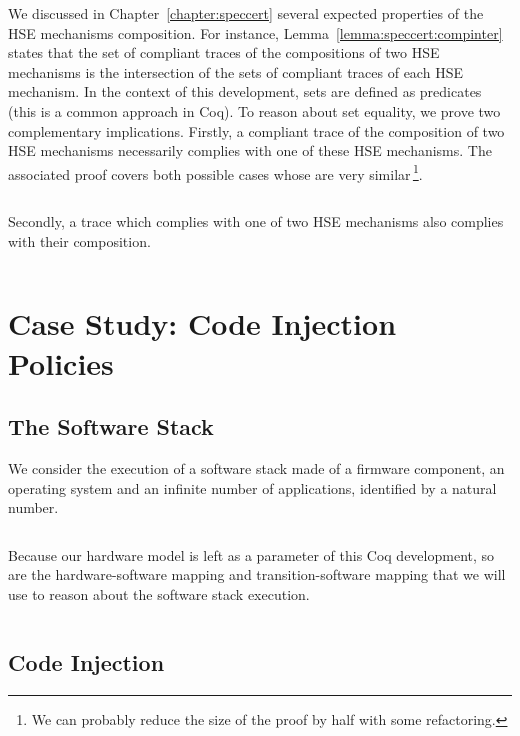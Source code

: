 \inputminted[gobble=2,firstline=424,lastline=428]{coq}{Listings/SpecCert.v}

We discussed in Chapter~\ref{chapter:speccert} several expected properties of
the HSE mechanisms composition.
%
For instance, Lemma~\ref{lemma:speccert:compinter} states that the set of
compliant traces of the compositions of two HSE mechanisms is the intersection
of the sets of compliant traces of each HSE mechanism.
%
In the context of this development, sets are defined as predicates (this is a
common approach in Coq).
%
To reason about set equality, we prove two complementary implications.
%
Firstly, a compliant trace of the composition of two HSE mechanisms necessarily
complies with one of these HSE mechanisms.
%
The associated proof covers both possible cases whose are very
similar\,\footnote{We can probably reduce the size of the proof by half with
  some refactoring.}.

\inputminted[gobble=2,firstline=472,lastline=512]{coq}{Listings/SpecCert.v}

Secondly, a trace which complies with one of two HSE mechanisms also complies
with their composition.

\inputminted[gobble=2,firstline=514,lastline=537]{coq}{Listings/SpecCert.v}

\section{Case Study: Code Injection Policies}

\subsection{The Software Stack}

We consider the execution of a software stack made of a firmware component, an
operating system and an infinite number of applications, identified by a natural
number.

\inputminted[gobble=2,firstline=262,lastline=269]{coq}{Listings/SpecCert.v}

Because our hardware model is left as a parameter of this Coq development, so
are the hardware-software mapping and transition-software mapping that we will
use to reason about the software stack execution.

\inputminted[gobble=2,firstline=271,lastline=272]{coq}{Listings/SpecCert.v}

\subsection{Code Injection}

